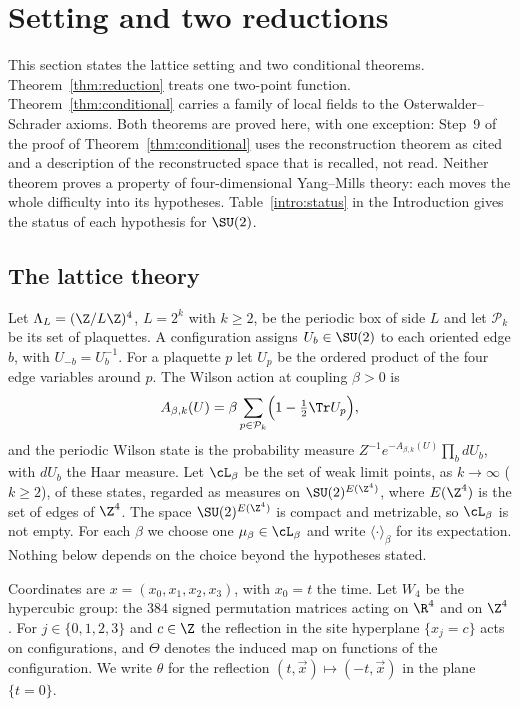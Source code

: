 \section{Setting and two reductions}\label{sec:reduction}

This section states the lattice setting and two conditional theorems. Theorem~\ref{thm:reduction} treats one two-point function. Theorem~\ref{thm:conditional} carries a family of local fields to the Osterwalder--Schrader axioms. Both theorems are proved here, with one exception: Step~9 of the proof of Theorem~\ref{thm:conditional} uses the reconstruction theorem as cited and a description of the reconstructed space that is recalled, not read. Neither theorem proves a property of four-dimensional Yang--Mills theory: each moves the whole difficulty into its hypotheses. Table~\ref{intro:status} in the Introduction gives the status of each hypothesis for $\SU(2)$.

\subsection{The lattice theory}\label{red:setting}

Let $\Lambda_L=(\Z/L\Z)^4$, $L=2^k$ with $k\ge2$, be the periodic box of side $L$ and let $\mathcal{P}_k$ be its set of plaquettes. A configuration assigns $U_b\in\SU(2)$ to each oriented edge $b$, with $U_{-b}=U_b^{-1}$. For a plaquette $p$ let $U_p$ be the ordered product of the four edge variables around $p$. The Wilson action at coupling $\beta>0$ is
\begin{equation}\label{red:action}
  A_{\beta,k}(U)=\beta\sum_{p\in\mathcal{P}_k}\Bigl(1-\tfrac12\Tr U_p\Bigr),
\end{equation}
and the periodic Wilson state is the probability measure $Z^{-1}e^{-A_{\beta,k}(U)}\prod_b dU_b$, with $dU_b$ the Haar measure. Let $\cL_\beta$ be the set of weak limit points, as $k\to\infty$ ($k\ge2$), of these states, regarded as measures on $\SU(2)^{E(\Z^4)}$, where $E(\Z^4)$ is the set of edges of $\Z^4$. The space $\SU(2)^{E(\Z^4)}$ is compact and metrizable, so $\cL_\beta$ is not empty. For each $\beta$ we choose one $\mu_\beta\in\cL_\beta$ and write $\langle\cdot\rangle_\beta$ for its expectation. Nothing below depends on the choice beyond the hypotheses stated.

Coordinates are $x=(x_0,x_1,x_2,x_3)$, with $x_0=t$ the time. Let $W_4$ be the hypercubic group: the $384$ signed permutation matrices acting on $\R^4$ and on $\Z^4$. For $j\in\{0,1,2,3\}$ and $c\in\Z$ the reflection in the site hyperplane $\{x_j=c\}$ acts on configurations, and $\Theta$ denotes the induced map on functions of the configuration. We write $\theta$ for the reflection $(t,\vec x)\mapsto(-t,\vec x)$ in the plane $\{t=0\}$.

